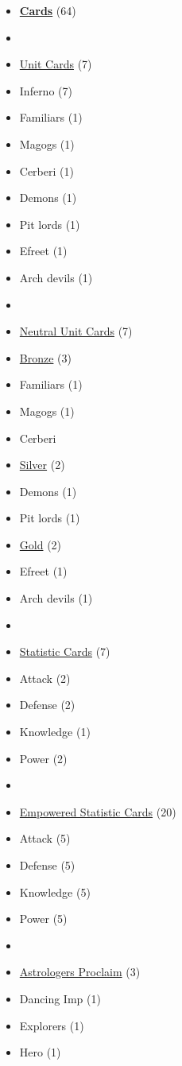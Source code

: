 \documentclass[12pt]{article}
\begin{document}
\begin{multicols}{3}
\begin{itemize}[leftmargin=0pt, label={}, noitemsep, noitemsep]
  \item \textbf{\underline{Cards}} (64)
  \item
  \item \underline{Unit Cards} (7)
  \item Inferno (7)
  \item Familiars (1)
  \item Magogs (1)
  \item Cerberi (1)
  \item Demons (1)
  \item Pit lords (1)
  \item Efreet (1)
  \item Arch devils (1)
  \item
  \item \underline{Neutral Unit Cards} (7)
  \item \underline{Bronze} (3)
  \item Familiars (1)
  \item Magogs (1)
  \item Cerberi
  \item \underline{Silver} (2)
  \item Demons (1)
  \item Pit lords (1)
  \item \underline{Gold} (2)
  \item Efreet (1)
  \item Arch devils (1)
  \item
  \item \underline{Statistic Cards} (7)
  \item Attack (2)
  \item Defense (2)
  \item Knowledge (1)
  \item Power (2)
  \item
  \item \underline{Empowered Statistic Cards} (20)
  \item Attack (5)
  \item Defense (5)
  \item Knowledge (5)
  \item Power (5)
  \item
  \item \underline{Astrologers Proclaim} (3)
  \item Dancing Imp (1)
  \item Explorers (1)
  \item Hero (1)

\end{itemize}
\end{multicols}
\end{document}
